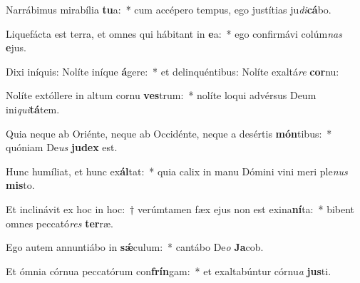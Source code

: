 \item Narrábimus mirabília \textbf{tu}a:~* cum accépero tempus, ego justítias ju\textit{di}\textbf{cá}bo.
\item Liquefácta est terra, et omnes qui hábitant in \textbf{e}a:~* ego confirmávi colúm\textit{nas} \textbf{e}jus.
\item Dixi iníquis: Nolíte iníque \textbf{á}gere:~* et delinquéntibus: Nolíte exaltá\textit{re} \textbf{cor}nu:
\item Nolíte extóllere in altum cornu \textbf{ves}trum:~* nolíte loqui advérsus Deum ini\textit{qui}\textbf{tá}tem.
\item Quia neque ab Oriénte, neque ab Occidénte, neque a desértis \textbf{món}tibus:~* quóniam De\textit{us} \textbf{ju}\textbf{dex} est.
\item Hunc humíliat, et hunc ex\textbf{ál}tat:~* quia calix in manu Dómini vini meri ple\textit{nus} \textbf{mis}to.
\item Et inclinávit ex hoc in hoc:~† verúmtamen fæx ejus non est exina\textbf{ní}ta:~* bibent omnes peccató\textit{res} \textbf{ter}ræ.
\item Ego autem annuntiábo in \textbf{sǽ}culum:~* cantábo De\textit{o} \textbf{Ja}cob.
\item Et ómnia córnua peccatórum con\textbf{frín}gam:~* et exaltabúntur córnu\textit{a} \textbf{jus}ti.
